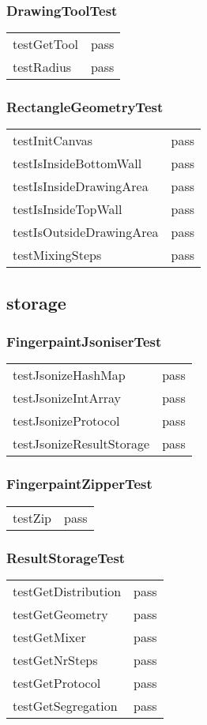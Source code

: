 \subsubsection*{DrawingToolTest}
\begin{tabular}{l|l}
testGetTool   & pass \\
testRadius    & pass \\
\end{tabular}

\subsubsection*{RectangleGeometryTest}
\begin{tabular}{l|l}
testInitCanvas                    & pass \\
testIsInsideBottomWall       & pass \\
testIsInsideDrawingArea    & pass \\
testIsInsideTopWall             & pass \\
testIsOutsideDrawingArea & pass \\
testMixingSteps                  & pass \\
\end{tabular}

\subsection{storage}
\subsubsection*{FingerpaintJsoniserTest}
\begin{tabular}{l|l}
testJsonizeHashMap         & pass \\
testJsonizeIntArray          & pass \\
testJsonizeProtocol           & pass \\
testJsonizeResultStorage & pass \\
\end{tabular}

\subsubsection*{FingerpaintZipperTest}
\begin{tabular}{l|l}
testZip & pass \\
\end{tabular}

\subsubsection*{ResultStorageTest}
\begin{tabular}{l|l}
testGetDistribution  & pass \\
testGetGeometry    & pass \\
testGetMixer           & pass \\
testGetNrSteps       & pass \\
testGetProtocol       & pass \\
testGetSegregation & pass \\
\end{tabular}

